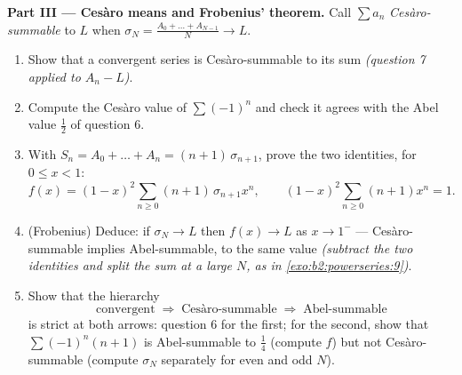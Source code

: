\begin{problem}
\medskip
\noindent\textbf{Part III --- Ces\`aro means and Frobenius'
theorem.} Call $\sum a_n$ \emph{Ces\`aro-summable} to $L$ when
$\sigma_N = \frac{A_0 + \dots + A_{N-1}}{N} \to L$.
\begin{enumerate}[resume]
  \item Show that a convergent series is Ces\`aro-summable to
        its sum \emph{(question 7 applied to $A_n - L$)}.
  \item Compute the Ces\`aro value of $\sum(-1)^n$ and check it
        agrees with the Abel value $\frac12$ of question 6.
  \item With $S_n = A_0 + \dots + A_n = (n+1)\,\sigma_{n+1}$,
        prove the two identities, for $0 \leq x < 1$:
        \[
        f(x) = (1-x)^2\sum_{n\geq0}(n+1)\,\sigma_{n+1}x^n,
        \qquad
        (1-x)^2\sum_{n\geq0}(n+1)x^n = 1 .
        \]
  \item (Frobenius) Deduce: if $\sigma_N \to L$ then $f(x) \to
        L$ as $x \to 1^-$ --- Ces\`aro-summable implies
        Abel-summable, to the same value \emph{(subtract the two
        identities and split the sum at a large $N$, as in
        \cref{exo:b2:powerseries:9})}.
  \item Show that the hierarchy
        \[
        \text{convergent} \;\Longrightarrow\;
        \text{Ces\`aro-summable} \;\Longrightarrow\;
        \text{Abel-summable}
        \]
        is strict at both arrows: question 6 for the first;
        for the second, show that $\sum(-1)^n(n+1)$ is
        Abel-summable to $\frac14$ (compute $f$) but not
        Ces\`aro-summable (compute $\sigma_N$ separately for
        even and odd $N$).
\end{enumerate}


\end{problem}
